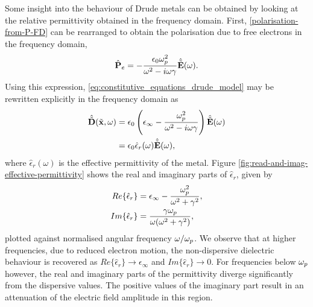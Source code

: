 Some insight into the behaviour of Drude metals can be obtained by looking at the relative permittivity obtained in the frequency domain. First, \eqref{polarisation-from-P-FD} can be rearranged to obtain the polarisation due to free electrons in the frequency domain,
\begin{equation}
\hat{\mathbf{P}}_e = - \frac{\epsilon_0 \omega_p^2}{\omega^2 - i \omega \gamma } \hat{\tilde{\mathbf{E}}}(\omega) .
  \label{eq:polarization-field-freq-domain}
\end{equation}
Using this expression, \eqref{eq:constitutive_equations_drude_model} may be rewritten explicitly in the frequency domain as
\begin{equation}
    \begin{split}
    \hat{\tilde{\mathbf{D}}}(\tilde{\mathbf{x}},\omega) &= \epsilon_0 \left( \epsilon_{\infty} - \frac{\omega_p^2 }{\omega^2 - i \omega \gamma } \right) \hat{\tilde{\mathbf{E}}}(\omega) \\
                                        &= \epsilon_0 \hat{\epsilon}_r (\omega) \hat{\tilde{\mathbf{E}}}(\omega) ,
    \end{split}
\end{equation}
where $\hat{\epsilon}_r(\omega)$ is the effective permittivity of the metal. Figure \ref{fig:read-and-imag-effective-permittivity} shows the real and imaginary parts of $\hat{\epsilon}_r$, given by
\begin{subequations}
\begin{align}
    Re\{ \hat{\epsilon}_r \} &= \epsilon_{\infty} - \frac{\omega_p^2}{\omega^2 + \gamma^2}, \\
    Im\{ \hat{\epsilon}_r \} &= \frac{\gamma \omega_p}{\omega ( \omega^2 + \gamma^2) } ,
\end{align}
\end{subequations}
plotted against normalised angular frequency $\omega / \omega_p$. We observe that at higher frequencies, due to reduced electron motion, the non-dispersive dielectric behaviour is recovered as $Re\{\hat{\epsilon}_r\} \to \epsilon_{\infty}$ and $Im\{\hat{\epsilon}_r\} \to 0$. For frequencies below $\omega_p$ however, the real and imaginary parts of the permittivity diverge significantly from the dispersive values. The positive values of the imaginary part result in an attenuation of the electric field amplitude in this region.

